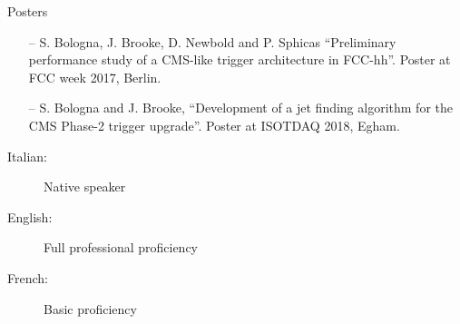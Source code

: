 \documentclass[10pt,a4paper]{altacv}
\begin{document}
{\large\color{emphasis}Posters\par}

\medskip

\begin{itemize}
    \item[--] S. Bologna, J. Brooke, D. Newbold and P. Sphicas ``Preliminary performance study of a CMS-like trigger architecture in FCC-hh''. Poster at FCC week 2017, Berlin.
    \item[--] S. Bologna and J. Brooke, ``Development of a jet finding algorithm for the CMS Phase-2 trigger upgrade''. Poster at ISOTDAQ 2018, Egham.
\end{itemize}


\medskip
\begin{description}
    \item[Italian:] Native speaker
    \item[English:] Full professional proficiency
    \item[French:] Basic proficiency
\end{description}











\end{document}
